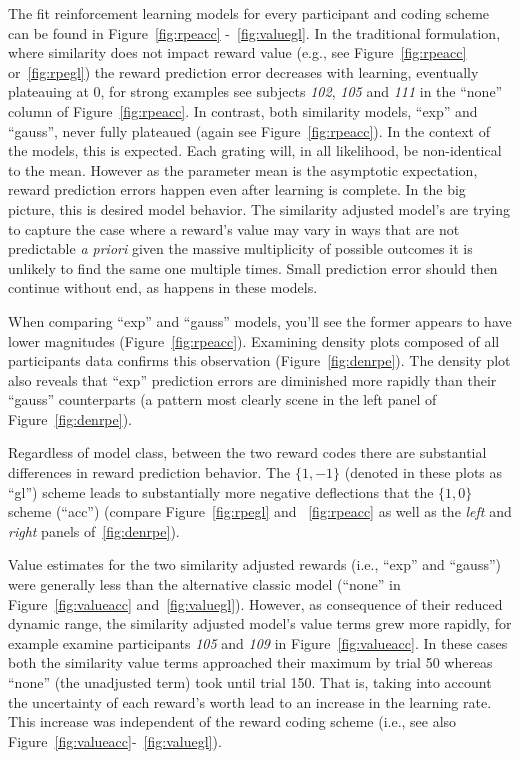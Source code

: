 \documentclass[doc,12pt]{apa}        %
\begin{document}
The fit reinforcement learning models for every participant and coding scheme can be found in Figure~\ref{fig:rpeacc} -~\ref{fig:valuegl}.  In the traditional formulation, where similarity does not impact reward value (e.g., see Figure~\ref{fig:rpeacc} or~\ref{fig:rpegl}) the reward prediction error decreases with learning, eventually plateauing at 0, for strong examples see subjects \emph{102}, \emph{105} and \emph{111} in the ``none'' column of Figure~\ref{fig:rpeacc}.  In contrast, both similarity models, ``exp'' and ``gauss'', never fully plateaued (again see Figure~\ref{fig:rpeacc}).  In the context of the models, this is expected.  Each grating will, in all likelihood, be non-identical to the mean. However as the parameter mean is the asymptotic expectation, reward prediction errors happen even after learning is complete.  In the big picture, this is desired model behavior.  The similarity adjusted model's are trying to capture the case where a reward's value may vary in ways that are not predictable \emph{a priori} given the massive multiplicity of possible outcomes it is unlikely to find the same one multiple times.  Small prediction error should then continue without end, as happens in these models.

When comparing ``exp'' and ``gauss'' models, you'll see the former appears to have lower magnitudes (Figure~\ref{fig:rpeacc}).  Examining density plots composed of all participants data confirms this observation (Figure~\ref{fig:denrpe}).  The density plot also reveals that ``exp'' prediction errors are diminished more rapidly than their ``gauss'' counterparts (a pattern most clearly scene in the left panel of Figure~\ref{fig:denrpe}).  

Regardless of model class, between the two reward codes there are substantial differences in reward prediction behavior.  The $\{1,-1\}$ (denoted in these plots as ``gl'') scheme leads to substantially more negative deflections that the $\{1,0\}$ scheme (``acc'') (compare Figure~\ref{fig:rpegl} and ~\ref{fig:rpeacc} as well as the \emph{left} and \emph{right} panels of~\ref{fig:denrpe}).   

Value estimates for the two similarity adjusted rewards (i.e., ``exp'' and ``gauss'') were generally less than the alternative classic model (``none'' in Figure~\ref{fig:valueacc} and~\ref{fig:valuegl}).  However, as consequence of their reduced dynamic range, the similarity adjusted model's value terms grew more rapidly, for example examine participants \emph{105} and \emph{109} in Figure~\ref{fig:valueacc}.  In these cases both the similarity value terms approached their maximum by trial 50 whereas ``none'' (the unadjusted term) took until trial 150.  That is, taking into account the uncertainty of each reward's worth lead to an increase in the learning rate.  This increase was independent of the reward coding scheme (i.e., see also Figure~\ref{fig:valueacc}-~\ref{fig:valuegl}).  
\end{document}
